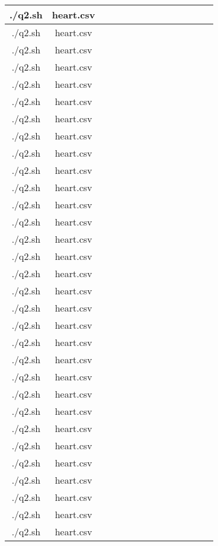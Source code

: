 \documentclass{article}
\begin{document}
\begin{table}[h!]
\begin{tabular}{|c|c|c|c|c|c|c|c|c|c|c|c|c|c|}
\hline./q2.sh & heart.csv &  &  &  &  &  &  &  &  &  &  &  &  \\ \hline./q2.sh & heart.csv &  &  &  &  &  &  &  &  &  &  &  &  \\ \hline./q2.sh & heart.csv &  &  &  &  &  &  &  &  &  &  &  &  \\ \hline./q2.sh & heart.csv &  &  &  &  &  &  &  &  &  &  &  &  \\ \hline./q2.sh & heart.csv &  &  &  &  &  &  &  &  &  &  &  &  \\ \hline./q2.sh & heart.csv &  &  &  &  &  &  &  &  &  &  &  &  \\ \hline./q2.sh & heart.csv &  &  &  &  &  &  &  &  &  &  &  &  \\ \hline./q2.sh & heart.csv &  &  &  &  &  &  &  &  &  &  &  &  \\ \hline./q2.sh & heart.csv &  &  &  &  &  &  &  &  &  &  &  &  \\ \hline./q2.sh & heart.csv &  &  &  &  &  &  &  &  &  &  &  &  \\ \hline./q2.sh & heart.csv &  &  &  &  &  &  &  &  &  &  &  &  \\ \hline./q2.sh & heart.csv &  &  &  &  &  &  &  &  &  &  &  &  \\ \hline./q2.sh & heart.csv &  &  &  &  &  &  &  &  &  &  &  &  \\ \hline./q2.sh & heart.csv &  &  &  &  &  &  &  &  &  &  &  &  \\ \hline./q2.sh & heart.csv &  &  &  &  &  &  &  &  &  &  &  &  \\ \hline./q2.sh & heart.csv &  &  &  &  &  &  &  &  &  &  &  &  \\ \hline./q2.sh & heart.csv &  &  &  &  &  &  &  &  &  &  &  &  \\ \hline./q2.sh & heart.csv &  &  &  &  &  &  &  &  &  &  &  &  \\ \hline./q2.sh & heart.csv &  &  &  &  &  &  &  &  &  &  &  &  \\ \hline./q2.sh & heart.csv &  &  &  &  &  &  &  &  &  &  &  &  \\ \hline./q2.sh & heart.csv &  &  &  &  &  &  &  &  &  &  &  &  \\ \hline./q2.sh & heart.csv &  &  &  &  &  &  &  &  &  &  &  &  \\ \hline./q2.sh & heart.csv &  &  &  &  &  &  &  &  &  &  &  &  \\ \hline./q2.sh & heart.csv &  &  &  &  &  &  &  &  &  &  &  &  \\ \hline./q2.sh & heart.csv &  &  &  &  &  &  &  &  &  &  &  &  \\ \hline./q2.sh & heart.csv &  &  &  &  &  &  &  &  &  &  &  &  \\ \hline./q2.sh & heart.csv &  &  &  &  &  &  &  &  &  &  &  &  \\ \hline./q2.sh & heart.csv &  &  &  &  &  &  &  &  &  &  &  &  \\ \hline./q2.sh & heart.csv &  &  &  &  &  &  &  &  &  &  &  &  \\ \hline./q2.sh & heart.csv &  &  &  &  &  &  &  &  &  &  &  &  \\ \hline./q2.sh & heart.csv &  &  &  &  &  &  &  &  &  &  &  &  \\ 
\end{tabular}
\end{table}
\end{document}
